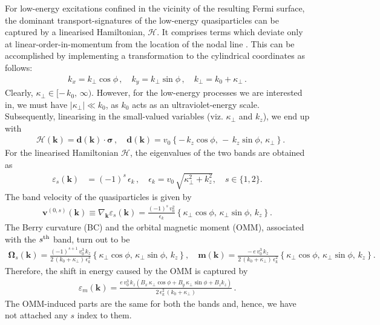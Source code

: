 \documentclass[aps,prb,onecolumn, footinbib, 10pt]{revtex4-2}
\newcommand{\bs}[1]{\boldsymbol{#1}}
\begin{document}
For low-energy excitations confined in the vicinity of the resulting Fermi surface, the dominant transport-signatures of the low-energy quasiparticles can be captured by a linearised Hamiltonian, $\mathcal{H}$. It comprises terms which deviate only at linear-order-in-momentum from the location of the nodal line \cite{linearize-nlsm, ips-nlsm-ph}. This can be accomplished by implementing a transformation to the cylindrical coordinates as follows:
\begin{align}
\label{eqtrs}
k_x = k_\perp \cos \phi \,, \quad
k_y = k_\perp \sin \phi \,,\quad k_\perp =  k_0 + \kappa_\perp \,.
\end{align}
Clearly, $ \kappa_\perp \in [-\, k_0,\,\infty )$. However, for the low-energy processes we are interested in, we must have $|\kappa_\perp | \ll k_0 $, as $k_0$ acts as an ultraviolet-energy scale.
Subsequently, linearising in the small-valued variables (viz. $\kappa_\perp $ and $k_z$), we end up with
\begin{align}
\label{eqham}
& \mathcal{H} (\bs k) = {\bs d} ( \bs k) \cdot \boldsymbol{\sigma} \,,
\quad
{\bs d} ( \bs k) = v_0 \left \lbrace  - \,k_z \cos \phi,\,
-\,k_z \sin \phi,\, \kappa_\perp \right \rbrace.
\end{align}
For the linearised Hamiltonian $\mathcal H$, the eigenvalues of the two bands are obtained as
\begin{align}
\label{eqev}
\varepsilon_s  ({ \bs k}) &= (-1)^s\, \epsilon_k \,, \quad 
 \epsilon_k = v_0\, \sqrt{ \kappa_\perp^2 +  k_z^2}, 
\quad s \in \lbrace 1,2 \rbrace.
\end{align}
The band velocity of the quasiparticles is given by
\begin{align}
\label{eqv}
{\boldsymbol v}^{(0,s)} ( \bs{k}) 
\equiv \nabla_{\bs{k}} \varepsilon_s  (\bs{k})
= \frac{ (-1)^s\, v_0^2}{\epsilon_k }  \left\lbrace 
\kappa_\perp \cos \phi, \, \kappa_\perp \sin\phi , \,k_z
\right\rbrace  .
\end{align}
The Berry curvature (BC) and the orbital magnetic moment (OMM), associated with the $s^{\rm{th}}$ band, turn out to be
\begin{align}
\label{eqbcomm}
\bs \Omega_s ({ \bs k})= 
\frac{(-1)^{s+1} \, v_0^3\,k_z} 
{2\, (k_0 + \kappa_\perp )\, \epsilon_k^3}
\left\lbrace \kappa_\perp \cos \phi  , \, \kappa_\perp \sin \phi,\, k_z \right\rbrace, \quad 
{\boldsymbol{m}} ({ \bs k}) 
= \frac{ -\,e \, v_0^3\,k_z} 
{2\, (k_0 + \kappa_\perp )\, \epsilon_k^2}
\left\lbrace \kappa_\perp \cos \phi  , \, \kappa_\perp \sin \phi,\, k_z \right\rbrace.
\end{align}
Therefore, the shift in energy caused by the OMM is captured by
\begin{align}
\varepsilon_m ({ \bs k}) 
= \frac{e \,v_0^3 \,k_z 
\left( B_x \,\kappa_\perp  \cos \phi + B_y \,\kappa_\perp  \sin \phi 
+ B_z k_z \right)}
{2 \,\epsilon_k^2 \,(k_0 + \kappa_\perp )}\,.
\end{align}
The OMM-induced parts are the same for both the bands and, hence, we have not attached any $s$ index to them.
\end{document}
